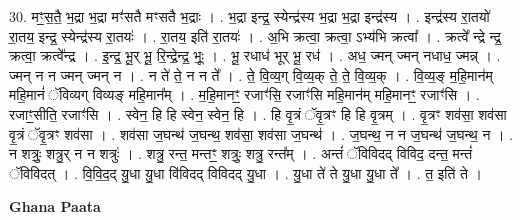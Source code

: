 \documentclass[17pt]{extarticle}
\begin{document}
30. मꣳ॒॒स॒तै॒ भ॒द्रा भ॒द्रा मꣳ॑सतै मꣳसतै भ॒द्राः । . भ॒द्रा इन्द्र॒ स्येन्द्र॑स्य भ॒द्रा भ॒द्रा इन्द्र॑स्य । . इन्द्र॑स्य रा॒तयो॑ रा॒तय॒ इन्द्र॒ स्येन्द्र॑स्य रा॒तयः॑ । . रा॒तय॒ इति॑ रा॒तयः॑ । . अ॒भि क्रत्वा॒ क्रत्वा॒ ऽभ्य॑भि क्रत्वा᳚ । . क्रत्वे᳚ न्द्रे न्द्र॒ क्रत्वा॒ क्रत्वे᳚न्द्र । . इ॒न्द्र॒ भू॒र् भू॒ रि॒न्द्रे॒न्द्र॒ भूः॒ । . भू॒ रधाध॑ भूर् भू॒ रध॑ । . अध॒ ज्मन् ज्मन् नधाध॒ ज्मन्न् । . ज्मन् न न ज्मन् ज्मन् न । . न ते॑ ते॒ न न ते᳚ । . ते॒ वि॒व्य॒ग् वि॒व्य॒क् ते॒ ते॒ वि॒व्य॒क् । . वि॒व्य॒ङ् म॒हि॒मान॑म् महि॒मानं॑ ॅविव्यग् विव्यङ् महि॒मान᳚म् । . म॒हि॒मानꣳ॒॒ रजाꣳ॑सि॒ रजाꣳ॑सि महि॒मान॑म् महि॒मानꣳ॒॒ रजाꣳ॑सि । . रजाꣳ॒॒सीति॒ रजाꣳ॑सि । . स्वेन॒ हि हि स्वेन॒ स्वेन॒ हि । . हि वृ॒त्रं ॅवृ॒त्रꣳ हि हि वृ॒त्रम् । . वृ॒त्रꣳ शव॑सा॒ शव॑सा वृ॒त्रं ॅवृ॒त्रꣳ शव॑सा । . शव॑सा ज॒घन्थ॑ ज॒घन्थ॒ शव॑सा॒ शव॑सा ज॒घन्थ॑ । . ज॒घन्थ॒ न न ज॒घन्थ॑ ज॒घन्थ॒ न । . न शत्रुः॒ शत्रु॒र् न न शत्रुः॑ । . शत्रु॒ रन्त॒ मन्तꣳ॒॒ शत्रुः॒ शत्रु॒ रन्त᳚म् । . अन्तं॑ ॅविविदद् विविद॒ दन्त॒ मन्तं॑ ॅविविदत् । . वि॒वि॒द॒द् यु॒धा यु॒धा वि॑विदद् विविदद् यु॒धा । . यु॒धा ते॑ ते यु॒धा यु॒धा ते᳚ । . त॒ इति॑ ते । \newline

\textbf{Ghana Paata } \newline
\end{document}
